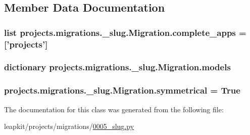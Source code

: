 \subsection{Member Data Documentation}
\hypertarget{classprojects_1_1migrations_1_10005__slug_1_1_migration_a9ba662762b7fa3708070007be8695180}{
\subsubsection[{complete\-\_\-apps}]{\setlength{\rightskip}{0pt plus 5cm}list projects.\-migrations.\-\_\-slug.\-Migration.\-complete\-\_\-apps = \mbox{[}'projects'\mbox{]}\hspace{0.3cm}{\ttfamily [static]}}}\label{classprojects_1_1migrations_1_10005__slug_1_1_migration_a9ba662762b7fa3708070007be8695180}
\hypertarget{classprojects_1_1migrations_1_10005__slug_1_1_migration_ad308bb15f66745ab0fd66dbfd391cfbb}{
\subsubsection[{models}]{\setlength{\rightskip}{0pt plus 5cm}dictionary projects.\-migrations.\-\_\-slug.\-Migration.\-models\hspace{0.3cm}{\ttfamily [static]}}}\label{classprojects_1_1migrations_1_10005__slug_1_1_migration_ad308bb15f66745ab0fd66dbfd391cfbb}
\hypertarget{classprojects_1_1migrations_1_10005__slug_1_1_migration_a05bfe24a22650a88327db1183aab8013}{
\subsubsection[{symmetrical}]{\setlength{\rightskip}{0pt plus 5cm}projects.\-migrations.\-\_\-slug.\-Migration.\-symmetrical = True\hspace{0.3cm}{\ttfamily [static]}}}\label{classprojects_1_1migrations_1_10005__slug_1_1_migration_a05bfe24a22650a88327db1183aab8013}


The documentation for this class was generated from the following file\-:\begin{DoxyCompactItemize}
\item 
leapkit/projects/migrations/\hyperlink{0005__slug_8py}{0005\-\_\-slug.\-py}\end{DoxyCompactItemize}
